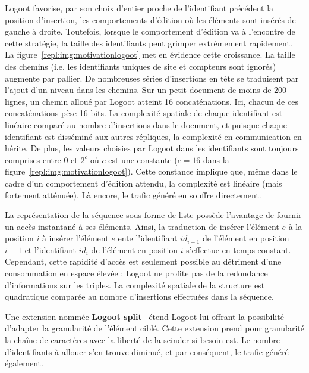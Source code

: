 \noindent Logoot favorise, par son choix d'entier proche de l'identifiant
précédent la position d'insertion, les comportements d'édition où les éléments
sont insérés de gauche à droite. Toutefois, lorsque le comportement d'édition va
à l'encontre de cette stratégie, la taille des identifiants peut grimper
extrêmement rapidement. La figure~\ref{repl:img:motivationlogoot} met en
évidence cette croissance. La taille des chemins (i.e. les identifiants uniques
de site et compteurs sont ignorés) augmente par pallier. De nombreuses séries
d'insertions en tête se traduisent par l'ajout d'un niveau dans les chemins. Sur
un petit document de moins de 200 lignes, un chemin alloué par Logoot atteint 16
concaténations. Ici, chacun de ces concaténations pèse 16 bits.  La complexité
spatiale de chaque identifiant est linéaire comparé au nombre d'insertions dans
le document, et puisque chaque identifiant est disséminé aux autres répliques,
la complexité en communication en hérite. De plus, les valeurs choisies par
Logoot dans les identifiants sont toujours comprises entre $0$ et $2^{c}$ où $c$
est une constante ($c = 16$ dans la
figure~\ref{repl:img:motivationlogoot}). Cette constance implique que, même dans
le cadre d'un comportement d'édition attendu, la complexité est linéaire (mais
fortement atténuée). Là encore, le trafic généré en souffre directement.

\noindent La représentation de la séquence sous forme de liste possède
l'avantage de fournir un accès instantané à ses éléments. Ainsi, la traduction
de \og insérer l'élément $e$ à la position $i$ \fg à \og insérer l'élément $e$
ente l'identifiant $id_{i-1}$ de l'élément en position $i-1$ et l'identifiant
$id_i$ de l'élément en position $i$ \fg s'effectue en temps constant.
Cependant, cette rapidité d'accès est seulement possible au détriment d'une
consommation en espace élevée : Logoot ne profite pas de la redondance
d'informations sur les triples. La complexité spatiale de la structure est
quadratique comparée au nombre d'insertions effectuées dans la séquence.

\noindent Une extension nommée \textbf{Logoot split}~\cite{andre2013supporting}
étend Logoot lui offrant la possibilité d'adapter la granularité de l'élément
ciblé.  Cette extension prend pour granularité la chaîne de caractères avec la
liberté de la scinder si besoin est. Le nombre d'identifiants à allouer s'en
trouve diminué, et par conséquent, le trafic généré également.

